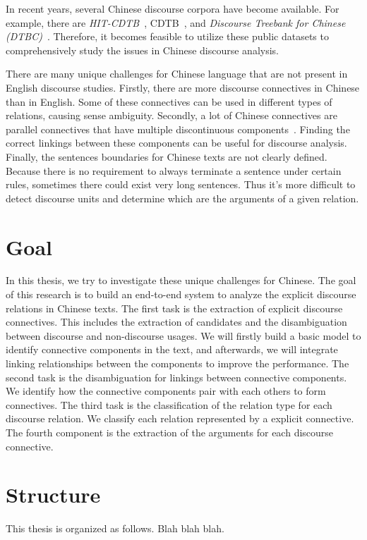 In recent years, several Chinese discourse corpora have become available. For example,
there are \textit{HIT-CDTB}~\citep{zhang2014chinese}, CDTB~\citep{li2014building}, and
\textit{Discourse Treebank for Chinese (DTBC)}~\citep{zhou2014the}. Therefore, it becomes feasible
to utilize these public datasets to comprehensively study the issues in Chinese discourse analysis.

There are many unique challenges for Chinese language that are not present in English discourse studies.
Firstly, there are more discourse connectives in Chinese than in English. Some of these connectives
can be used in different types of relations, causing sense ambiguity.
Secondly, a lot of Chinese connectives are parallel connectives that have multiple
discontinuous components~\citep{zhou2012pdtb}. Finding the correct linkings between these components can
be useful for discourse analysis.
Finally, the sentences boundaries for Chinese texts are not clearly defined. Because there is no
requirement to always terminate a sentence under certain rules, sometimes there could exist very
long sentences. Thus it's more difficult to detect discourse units and determine which are
the arguments of a given relation.

%
%
\section{Goal}

In this thesis, we try to investigate these unique challenges for Chinese.
The goal of this research is to build an end-to-end system to analyze
the explicit discourse relations in Chinese texts. The first task is
the extraction of explicit discourse connectives. This includes
the extraction of candidates and the disambiguation between discourse
and non-discourse usages. We will firstly build a basic model to identify
connective components in the text, and afterwards, we will integrate linking
relationships between the components to improve the performance.
The second task is the disambiguation for linkings between connective components.
We identify how the connective components pair with each others to form connectives.
The third task is the classification of the relation type for each discourse relation.
We classify each relation represented by a explicit connective.
The fourth component is the extraction of the arguments for each discourse connective.

%
%
\section{Structure}
This thesis is organized as follows. Blah blah blah.
